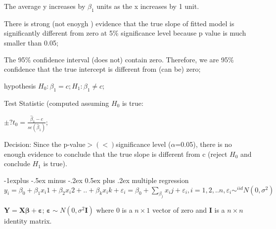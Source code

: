 \documentclass[10pt,landscape]{article}
\makeatletter
\renewcommand{\subsection}{\@startsection{subsection}{2}{0mm}%
                                {-1explus -.5ex minus -.2ex}%
                                {0.5ex plus .2ex}%
                                {\normalfont\small\bfseries}}
\makeatother
\begin{document}
\begin{multicols}{3}
The average y increases by $\beta_1$ units as the x increases by 1 unit.

There is strong (not enoygh ) evidence that the true slope of fitted model is significantly different from zero at 5\% significance level because p value is much smaller than 0.05;

The 95\% confidence interval (does not) contain zero. Therefore, we are 95\% confidence that the true intercept is different from (can be) zero;

hypothesis $H_0:\beta_1=c; H_1:\beta_1\ne c$;

Test Statistic (computed assuming $H_0$ is true:

$\pm? t_0=\frac{\hat\beta_1-c}{se(\hat\beta_1)}$;

Decision: Since the p-value$>(<)$significance level ($\alpha$=0.05), there is no enough evidence to conclude that the true slope is different from c (reject $H_0$ and conclude $H_1$ is true).

\subsection{multiple regression}
$y_i=\beta_0+\beta_1x_i1+\beta_2x_i2+..+\beta_kx_ik+\varepsilon_i=\beta_0+\sum_{\beta_j}x_ij+\varepsilon_i, i=1,2,..n, \varepsilon_i\sim^{iid} N(0,\sigma^2) $

$\mathbf{Y}=\mathbf{X}\mathbf{\beta}+\mathbf{\varepsilon}$; $\mathbf{\varepsilon}\sim N(0,\sigma^2\mathbf{I})$ where 0 is a $n\times1$ vector of zero and $\mathbf{I}$ is a $n\times n$ identity matrix.




\end{multicols}
\end{document}
